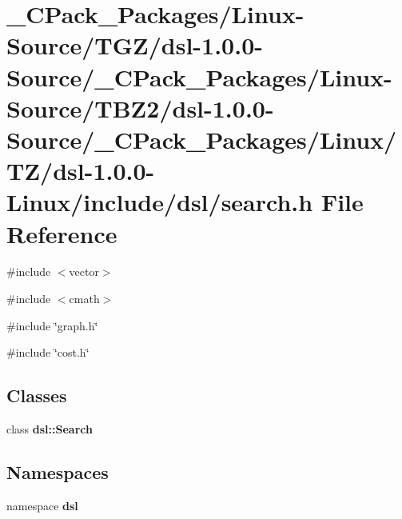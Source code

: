 \section{\_\-CPack\_\-Packages/Linux-\/Source/TGZ/dsl-\/1.0.0-\/Source/\_\-CPack\_\-Packages/Linux-\/Source/TBZ2/dsl-\/1.0.0-\/Source/\_\-CPack\_\-Packages/Linux/TZ/dsl-\/1.0.0-\/Linux/include/dsl/search.h File Reference}
\label{__CPack__Packages_2Linux-Source_2TGZ_2dsl-1_80_80-Source_2__CPack__Packages_2Linux-Source_2TBZ2_82b75e46f56f567a0b32ef6e89b5532e}
{\ttfamily \#include $<$vector$>$}\par
{\ttfamily \#include $<$cmath$>$}\par
{\ttfamily \#include \char`\"{}graph.h\char`\"{}}\par
{\ttfamily \#include \char`\"{}cost.h\char`\"{}}\par
\subsection*{Classes}
\begin{DoxyCompactItemize}
\item 
class {\bf dsl::Search}
\end{DoxyCompactItemize}
\subsection*{Namespaces}
\begin{DoxyCompactItemize}
\item 
namespace {\bf dsl}
\end{DoxyCompactItemize}
